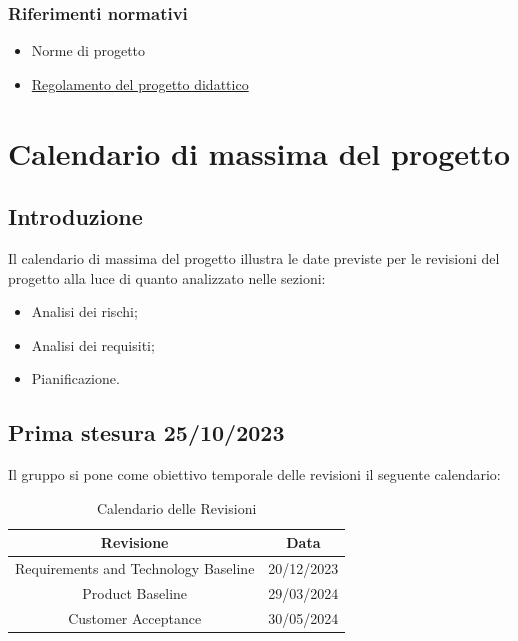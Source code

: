 \documentclass{article}
\begin{document}
\subsubsection{Riferimenti normativi}
\begin{itemize}
\item Norme di progetto
\item \href {https://www.math.unipd.it/~tullio/IS-1/2023/Dispense/PD2.pdf} {Regolamento del progetto didattico}
\end{itemize}


\section{Calendario di massima del progetto}
\subsection{Introduzione}
Il calendario di massima del progetto illustra le date previste per le revisioni del progetto
alla luce di quanto analizzato nelle sezioni:
\begin{itemize}
    \item Analisi dei rischi;
    \item Analisi dei requisiti;
    \item Pianificazione.
\end{itemize}
\subsection{Prima stesura 25/10/2023}
Il gruppo si pone come obiettivo temporale delle revisioni il seguente calendario:
\begin{table}[ht]
    \centering
    \begin{tabular}{|c|c|}
        \hline
        \textbf{Revisione} & \textbf{Data} \\
        \hline
        Requirements and Technology Baseline & 20/12/2023 \\
        Product Baseline  & 29/03/2024 \\
        Customer Acceptance & 30/05/2024 \\
        \hline
    \end{tabular}
    \caption{Calendario delle Revisioni}
\end{table}
\end{document}
